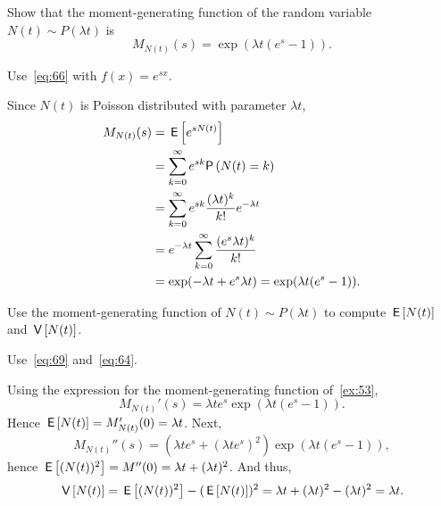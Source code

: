 \begin{extra} 
Show that the moment-generating function of the random variable~$N(t)\sim P(\lambda t)$ is
\begin{equation*}
M_{N(t)}(s) 
= \exp{(\lambda t(e^s-1))}.
\end{equation*}
\begin{hint}
Use~\cref{eq:66} with $f(x) = e^{sx}$. \end{hint}
\begin{solution}
Since $N(t)$ is Poisson distributed with parameter $\lambda t$, 
\begin{align*}
M_{N(t)}(s)
&= \E{e^{s N(t)}} \\
&= \sum_{k=0}^\infty e^{s k} \P{N(t)=k} \\
&= \sum_{k=0}^\infty e^{s k} \frac{(\lambda t)^k}{k!} e^{-\lambda t} \\
&= e^{-\lambda t} \sum_{k=0}^\infty \frac{(e^s \lambda t)^k}{k!} \\
&= \exp(-\lambda t + e^s \lambda t) =\exp(\lambda t(e^s - 1)).
\end{align*}
\end{solution}
\end{extra}

\begin{exercise} 
 Use the moment-generating function of $N(t)\sim P(\lambda t)$ to compute $\,\mathsf{E}\left[N(t)\right]$ and $\,\mathsf{V}\left[N(t)\right]$. 
\begin{hint}
Use~\cref{eq:69} and~\cref{eq:64}. 
\end{hint}
\begin{solution}
Using the expression for the moment-generating function of~\cref{ex:53},
 \begin{equation*}
 M_{N(t)}'(s) = \lambda t e^s \exp(\lambda t(e^s - 1)).
 \end{equation*}
Hence $\,\mathsf{E}\left[N(t)\right] = M_{N(t)}'(0) = \lambda t $. Next, 
 \begin{equation*}
 M_{N(t)}''(s) = (\lambda t e^s + (\lambda t e^s)^2) \exp(\lambda t(e^s - 1)),
 \end{equation*}
hence $\,\mathsf{E}\left[(N(t))^2\right] = M''(0) = \lambda t + (\lambda t)^2$. And thus, 
\begin{equation*}
\,\mathsf{V}\left[N(t)\right] =\,\mathsf{E}\left[(N(t))^2\right]-(\,\mathsf{E}\left[N(t)\right])^2 = \lambda t + (\lambda t)^2 - (\lambda t)^2 = \lambda t.
\end{equation*}
\end{solution}
\end{exercise}

